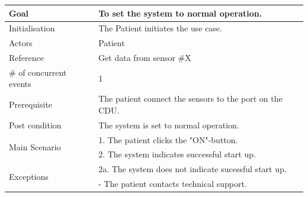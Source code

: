 \begin{table}[H]
	\centering
	\begin{tabular}{|l|p{10cm}|}
	\hline
	Goal 							& To set the system to normal operation. \\ \hline
	Initialisation 					& The Patient initiates the use case. \\ \hline
	\multirow{1}{*}{Actors} 		& Patient \\ 
 \hline
	Reference 						& Get data from sensor \#X \\ \hline
	\# of concurrent events 		& 1 \\ \hline
	Prerequisite  					& The patient connect the sensors to the port on the CDU. \\ \hline
	Post condition 					& The system is set to normal operation. \\ \hline
	\multirow{2}{*}{Main Scenario} 	& 1. The patient clicks the  "ON"-button. \\
	& 2. The system indicates successful start up.\\ \hline
	\multirow{2}{*}{Exceptions} & 2a. The system does not indicate sucessful start up. \\
	& - The patient contacts technical support. \\ \hline
	\end{tabular}
\end{table}

